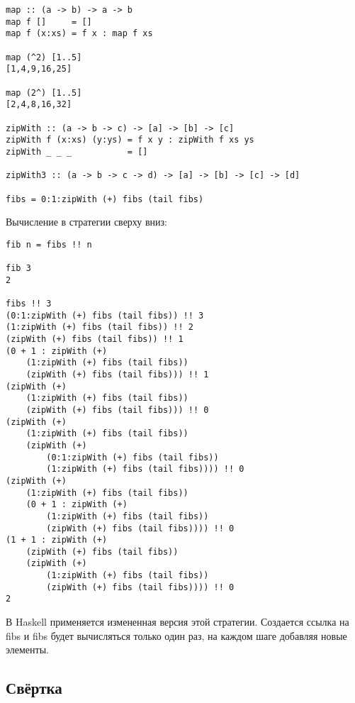 \documentclass[a4paper,10pt]{article}
\begin{document}
\begin{lstlisting}
map :: (a -> b) -> a -> b
map f []     = []
map f (x:xs) = f x : map f xs

map (^2) [1..5]
[1,4,9,16,25]

map (2^) [1..5]
[2,4,8,16,32]

zipWith :: (a -> b -> c) -> [a] -> [b] -> [c]
zipWith f (x:xs) (y:ys) = f x y : zipWith f xs ys
zipWith _ _ _           = []

zipWith3 :: (a -> b -> c -> d) -> [a] -> [b] -> [c] -> [d]

fibs = 0:1:zipWith (+) fibs (tail fibs)
\end{lstlisting}
Вычисление в стратегии сверху вниз:
\begin{lstlisting}
fib n = fibs !! n

fib 3
2

fibs !! 3
(0:1:zipWith (+) fibs (tail fibs)) !! 3
(1:zipWith (+) fibs (tail fibs)) !! 2
(zipWith (+) fibs (tail fibs)) !! 1
(0 + 1 : zipWith (+)
    (1:zipWith (+) fibs (tail fibs))
    (zipWith (+) fibs (tail fibs))) !! 1
(zipWith (+)
    (1:zipWith (+) fibs (tail fibs))
    (zipWith (+) fibs (tail fibs))) !! 0
(zipWith (+)
    (1:zipWith (+) fibs (tail fibs))
    (zipWith (+)
        (0:1:zipWith (+) fibs (tail fibs))
        (1:zipWith (+) fibs (tail fibs)))) !! 0
(zipWith (+)
    (1:zipWith (+) fibs (tail fibs))
    (0 + 1 : zipWith (+)
        (1:zipWith (+) fibs (tail fibs))
        (zipWith (+) fibs (tail fibs)))) !! 0
(1 + 1 : zipWith (+)
    (zipWith (+) fibs (tail fibs))
    (zipWith (+)
        (1:zipWith (+) fibs (tail fibs))
        (zipWith (+) fibs (tail fibs)))) !! 0
2
\end{lstlisting}

В Haskell применяется измененная версия этой стратегии.
Создается ссылка на fibs и fibs будет вычисляться только один раз, на каждом шаге добавляя новые
элементы.

\clearpage

\subsection{Свёртка}
\end{document}
